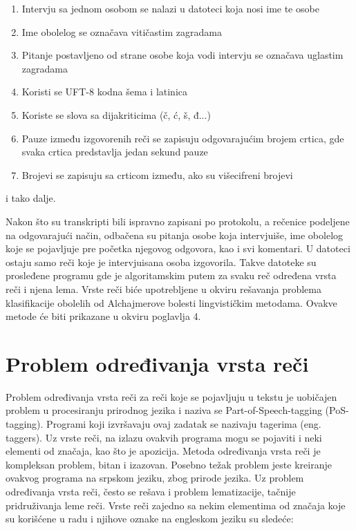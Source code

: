 \documentclass[12pt,oneside]{memoir}
\begin{document}
\begin{enumerate}
\item Intervju sa jednom osobom se nalazi u datoteci koja nosi ime te osobe
\item Ime obolelog se označava vitičastim zagradama
\item Pitanje postavljeno od strane osobe koja vodi intervju se označava uglastim zagradama
\item Koristi se UFT-8 kodna šema i latinica
\item Koriste se slova sa dijakriticima (č, ć, š, đ...)
\item Pauze između izgovorenih reči se zapisuju odgovarajućim brojem crtica, gde svaka crtica predstavlja jedan sekund pauze
\item Brojevi se zapisuju sa crticom između, ako su višecifreni brojevi
\end{enumerate}
i tako dalje.  

Nakon što su transkripti bili ispravno zapisani po protokolu, a rečenice podeljene na odgovarajući način, odbačena su pitanja osobe koja intervjuiše, ime obolelog koje se pojavljuje pre početka njegovog odgovora, kao i svi komentari. U datoteci ostaju samo reči koje je intervjuisana osoba izgovorila. Takve datoteke su prosleđene programu gde je algoritamskim putem za svaku reč određena vrsta reči i njena lema. Vrste reči biće upotrebljene u okviru rešavanja problema klasifikacije obolelih od Alchajmerove bolesti lingvističkim metodama. Ovakve metode će biti prikazane u okviru poglavlja 4.  

\section{Problem određivanja vrsta reči}

Problem određivanja vrsta reči za reči koje se pojavljuju u tekstu je uobičajen problem u procesiranju prirodnog jezika i naziva se Part-of-Speech-tagging (PoS-tagging).  Programi koji izvršavaju ovaj zadatak se nazivaju tagerima (eng. taggers).  Uz vrste reči, na izlazu ovakvih programa mogu se pojaviti i neki elementi od značaja, kao što je apozicija.  Metoda određivanja vrsta reči je kompleksan problem, bitan i izazovan. Posebno težak problem jeste kreiranje ovakvog programa na srpskom jeziku, zbog prirode jezika. Uz problem određivanja vrsta reči, često se rešava i problem lematizacije, tačnije pridruživanja leme reči. Vrste reči zajedno sa nekim elementima od značaja koje su korišćene u radu i njihove oznake na engleskom jeziku su sledeće:
\end{document}
